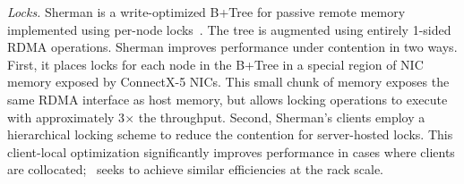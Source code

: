 \emph{Locks.}  Sherman is a write-optimized B+Tree for passive remote
memory implemented using per-node locks~\cite{sherman}. The tree is
augmented using entirely 1-sided RDMA operations. Sherman improves
performance under contention in two ways. First, it places locks for
each node in the B+Tree in a special region of NIC memory exposed by
ConnectX-5 NICs.  This small chunk of memory exposes the same RDMA
interface as host memory, but allows locking operations to execute
with approximately 3$\times$ the throughput.  Second, Sherman's
clients employ a hierarchical locking scheme to reduce the contention
for server-hosted locks.  This client-local optimization significantly
improves performance in cases where clients are collocated;
\sword\ seeks to achieve similar efficiencies at the rack scale.









